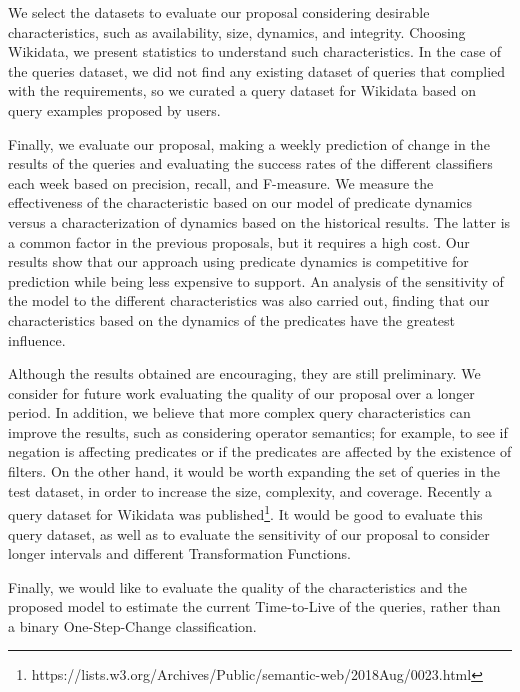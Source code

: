 \documentclass[runningheads]{llncs}
\begin{document}
We select the datasets to evaluate our proposal considering desirable characteristics, such as availability, size, dynamics, and integrity. Choosing Wikidata, we present statistics to understand such characteristics. In the case of the queries dataset, we did not find any existing dataset of queries that complied with the requirements, so we curated a query dataset for Wikidata based on query examples proposed by users.

Finally, we evaluate our proposal, making a weekly prediction of change in the results of the queries and evaluating the success rates of the different classifiers each week based on precision, recall, and F-measure.
We measure the effectiveness of the characteristic based on our model of predicate dynamics versus a characterization of dynamics based on the historical results. The latter is a common factor in the previous proposals, but it requires a high cost. Our results show that our approach using predicate dynamics is competitive for prediction while being less expensive to support. An analysis of the sensitivity of the model to the different characteristics was also carried out, finding that our characteristics based on the dynamics of the predicates have the greatest influence.    

Although the results obtained are encouraging, they are still preliminary. We consider for future work evaluating the quality of our proposal over a longer period. In addition, we believe that more complex query characteristics can improve the results, such as considering operator semantics; for example, to see if negation is affecting predicates or if the predicates are affected by the existence of filters. On the other hand, it would be worth expanding the set of queries in the test dataset, in order to increase the size, complexity, and coverage. Recently a query dataset for Wikidata was published\footnote{https://lists.w3.org/Archives/Public/semantic-web/2018Aug/0023.html}. It would be good to evaluate this query dataset, as well as to evaluate the sensitivity of our proposal to consider longer intervals and different Transformation Functions.

Finally, we would like to evaluate the quality of the characteristics and the proposed model to estimate the current Time-to-Live of the queries, rather than a binary One-Step-Change classification.




\end{document}
